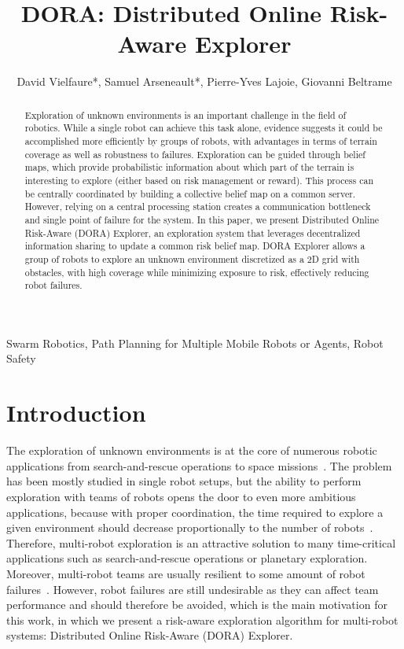 \documentclass[letterpaper, 10 pt, conference]{ieeeconf}
\title{\LARGE \bf DORA: Distributed Online Risk-Aware Explorer}
\author{David Vielfaure*, Samuel Arseneault*, Pierre-Yves Lajoie, Giovanni Beltrame}
\begin{document}
\maketitle

\begin{abstract}
    Exploration of unknown environments is an important challenge in the
    field of robotics. While a single robot can achieve this task alone,
    evidence suggests it could be accomplished more efficiently by
    groups of robots, with advantages in terms of terrain coverage as
    well as robustness to failures. Exploration can be guided through
    belief maps, which provide probabilistic information about which
    part of the terrain is interesting to explore (either based on risk
    management or reward). This process can be centrally coordinated by
    building a collective belief map on a common server. However,
    relying on a central processing station creates a communication
    bottleneck and single point of failure for the system. In this
    paper, we present Distributed Online Risk-Aware (DORA) Explorer, an
    exploration system that leverages decentralized information sharing
    to update a common risk belief map. DORA Explorer allows a group of
    robots to explore an unknown environment discretized as a 2D grid
    with obstacles, with high coverage while minimizing exposure to
    risk, effectively reducing robot failures.
\end{abstract}

\begin{keywords}
Swarm Robotics, Path Planning for Multiple Mobile Robots or Agents, Robot Safety
\end{keywords}


\section{Introduction}
The exploration of unknown environments is at the core of numerous
robotic applications from search-and-rescue operations
\cite{matos2016multiple} to space
missions~\cite{fong2005interaction}. The problem has been mostly
studied in single robot setups, but the ability to perform exploration
with teams of robots opens the door to even more ambitious
applications, because with proper coordination, the time required to
explore a given environment should decrease proportionally to the
number of robots~\cite{burgard2005coordinated}. Therefore, multi-robot
exploration is an attractive solution to many time-critical
applications such as search-and-rescue operations or planetary
exploration. Moreover, multi-robot teams are usually resilient to some
amount of robot
failures~\cite{ramachandran2019resilience,wehbe2021probabilistic,winfield2006safety}. However,
robot failures are still undesirable as they can affect team
performance and should therefore be avoided, which is the main
motivation for this work, in which we present a risk-aware exploration
algorithm for multi-robot systems: Distributed Online Risk-Aware
(DORA) Explorer.
\end{document}

